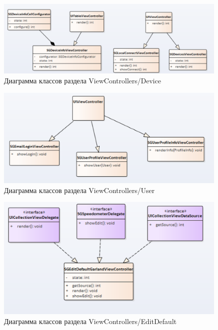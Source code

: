 \newpage
~
\begin{figure}[H]
\centering
	\includegraphics[scale=0.5]{figures/diagrams/class/vc_device.png}
	\caption{Диаграмма классов раздела ViewControllers/Device}
	\label{fig:appendices:classDiagram:vc_device}
\end{figure}

\begin{figure}[H]
\centering
	\includegraphics[scale=0.5]{figures/diagrams/class/vc_user.png}
	\caption{Диаграмма классов раздела ViewControllers/User}
	\label{fig:appendices:classDiagram:vc_user}
\end{figure}

\begin{figure}[H]
\centering
	\includegraphics[scale=0.5]{figures/diagrams/class/vc_editDefault.png}
	\caption{Диаграмма классов раздела ViewControllers/EditDefault}
	\label{fig:appendices:classDiagram:vc_editDefault}
\end{figure}

